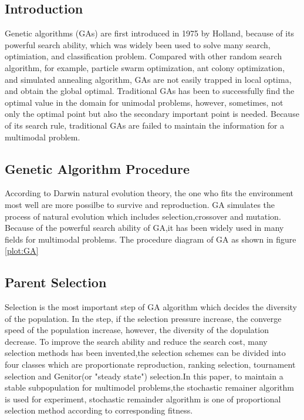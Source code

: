 \documentclass[smallextended]{svjour3}       %
\begin{document}
\begin{multicols}{2}

\section{Introduction}
Genetic algorithms (GAs) are first introduced in 1975 by
Holland\cite{sampson1976adaptation}, because of its powerful search ability,
which was widely been used to solve many search, optimiation, and classification
problem. Compared with other random search algorithm, for example, particle
swarm optimization, ant colony optimization, and simulated annealing
algorithm\cite{zabinsky2010random}, GAs are not easily trapped in local optima,
and obtain the global optimal.  Traditional GAs has been to successfully find
the optimal value in the domain for unimodal problems, however, sometimes, not
only the optimal point but also the secondary important point is needed.
Because of its search rule, traditional GAs are failed to maintain the
information for a multimodal problem.


\subsection{Genetic Algorithm Procedure}
According to Darwin natural evolution theory, the one who fits the environment
most well are more possilbe to survive and reproduction. GA simulates the
process of natural evolution which includes selection,crossover and mutation.
Because of the powerful search ability of GA,it has been widely used in many
fields for multimodal problems. The procedure diagram of GA as shown in figure
\ref{plot:GA} 
 
\subsection{Parent Selection}
Selection is the most important step of GA algorithm which decides the diversity
of the population. In the step, if the selection pressure increase, the converge
speed of the population increase, however, the diversity of the dopulation
decrease. To improve the search ability and reduce the search cost,
many selection methods \cite{goldberg1991comparative} has been invented,the
selection schemes can be divided into four classes which are proportionate
reproduction, ranking selection, tournament selection and Genitor(or "steady
state") selection.In this paper, to maintain a stable subpopulation for
multimodel problems,the stochastic remainer algorithm is used for experiment,
stochastic remainder algorithm is one of proportional selection method according
to corresponding fitness.


\end{multicols}
\end{document}
